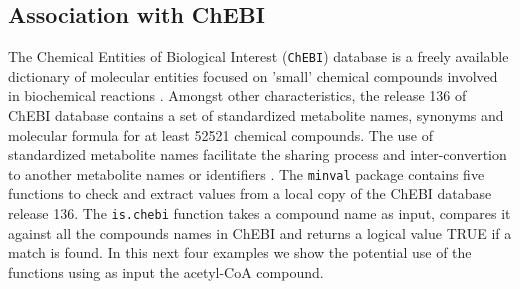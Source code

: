 \subsection{Association with ChEBI}
The Chemical Entities of Biological Interest (\texttt{ChEBI}) database  is a freely available dictionary of molecular entities focused on 'small' chemical compounds involved in biochemical reactions \cite{Degtyarenko2007}. Amongst other characteristics, the release 136 of ChEBI database contains a set of standardized metabolite names, synonyms and molecular formula for at least 52521 chemical compounds. The use of standardized metabolite names facilitate the sharing process and inter-convertion to another metabolite names  or identifiers \cite{Bernard2014, Ravikrishnan2015}. The \texttt{minval} package contains five functions to check and extract values from a local copy of the ChEBI database release 136. The \texttt{is.chebi} function takes a compound name as input, compares it against all the compounds names in ChEBI and returns a logical value TRUE if a match is found. In this next four examples we show the potential use of the functions using as input the acetyl-CoA compound.
